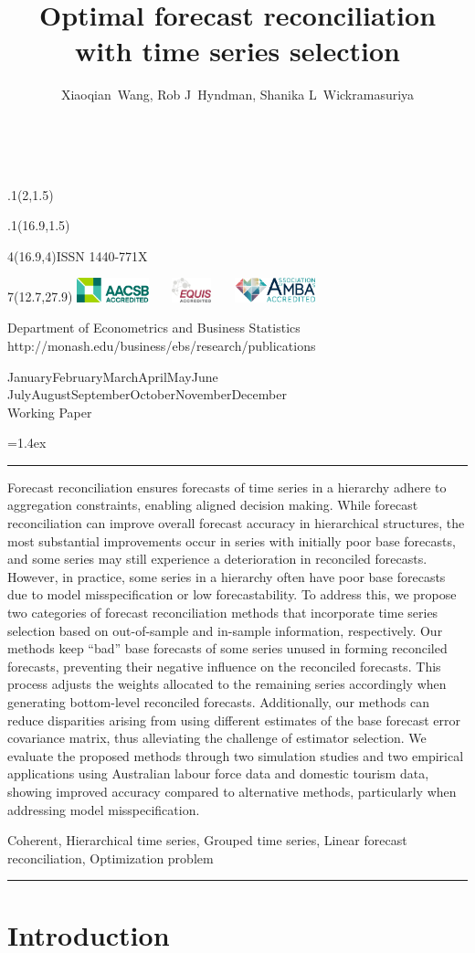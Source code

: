 \documentclass[11pt,a4paper,]{article}
\title{Optimal forecast reconciliation with time series selection}
\author{Xiaoqian~Wang, Rob J~Hyndman, Shanika L~Wickramasuriya}
\date{\sf\Date~\Month~\Year}
\makeatletter
\def\Date{\number\day}
\def\Month{\ifcase\month\or
 January\or February\or March\or April\or May\or June\or
 July\or August\or September\or October\or November\or December\fi}
\def\Year{\number\year}
\def\showjel{{\large\textsf{\textbf{JEL classification:}}~\@jel}}
\def\cover{{\sffamily\setcounter{page}{0}
        \thispagestyle{empty}
        \placefig{2}{1.5}{width=5cm}{_extensions/wp/monash2}
        \placefig{16.9}{1.5}{width=2.1cm}{_extensions/wp/MBSportrait}
        \begin{textblock}{4}(16.9,4)ISSN 1440-771X\end{textblock}
        \begin{textblock}{7}(12.7,27.9)\hfill
        \includegraphics[height=0.7cm]{_extensions/wp/AACSB}~~~
        \includegraphics[height=0.7cm]{_extensions/wp/EQUIS}~~~
        \includegraphics[height=0.7cm]{_extensions/wp/AMBA}
        \end{textblock}
        \vspace*{2cm}
        \begin{center}\Large
        Department of Econometrics and Business Statistics\\[.5cm]
        \footnotesize http://monash.edu/business/ebs/research/publications
        \end{center}\vspace{2cm}
        \begin{center}
        \fbox{\parbox{14cm}{\begin{onehalfspace}\centering\Huge\vspace*{0.3cm}
                \textsf{\textbf{\expandafter{\@title}}}\vspace{1cm}\par
                \LARGE\@author\end{onehalfspace}
        }}
        \end{center}
        \vfill
                \begin{center}\Large
                \Month~\Year\\[1cm]
                Working Paper \@wp
        \end{center}\vspace*{2cm}}}
\def\pageone{{\sffamily\setstretch{1}%
        \thispagestyle{empty}%
        \vbox to \textheight{%
        \raggedright\baselineskip=1.2cm
     {\fontsize{24.88}{30}\sffamily\textbf{\expandafter{\@title}}}
        \vspace{2cm}\par
        \hspace{1cm}\parbox{14cm}{\sffamily\large\@addresses}\vspace{1cm}\vfill
        \hspace{1cm}{\large\Date~\Month~\Year}\\[1cm]
        \hspace{1cm}\showjel\vss}}}
\def\blindtitle{{\sffamily
     \thispagestyle{plain}\raggedright\baselineskip=1.2cm
     {\fontsize{24.88}{30}\sffamily\textbf{\expandafter{\@title}}}\vspace{1cm}\par
        }}
\def\titlepage{{\cover\newpage\pageone\newpage\blindtitle}}
\let\maketitle\titlepage
\newenvironment{keywords}{\par\vspace{0.5cm}\noindent{\sffamily\textbf{Keywords:}}}{\vspace{0.25cm}\par\hrule\vspace{0.5cm}\par}
\renewenvironment{abstract}{\begin{minipage}{\textwidth}\parskip=1.4ex\noindent
\hrule\vspace{0.1cm}\par{\sffamily\textbf{\abstractname}}\newline}
  {\end{minipage}}
\def\placefig#1#2#3#4{\begin{textblock}{.1}(#1,#2)\rlap{\texttt{[image: \#4]}}\end{textblock}}
\makeatother
\begin{document}
\maketitle
\begin{abstract}
Forecast reconciliation ensures forecasts of time series in a hierarchy
adhere to aggregation constraints, enabling aligned decision making.
While forecast reconciliation can improve overall forecast accuracy in
hierarchical structures, the most substantial improvements occur in
series with initially poor base forecasts, and some series may still
experience a deterioration in reconciled forecasts. However, in
practice, some series in a hierarchy often have poor base forecasts due
to model misspecification or low forecastability. To address this, we
propose two categories of forecast reconciliation methods that
incorporate time series selection based on out-of-sample and in-sample
information, respectively. Our methods keep ``bad'' base forecasts of
some series unused in forming reconciled forecasts, preventing their
negative influence on the reconciled forecasts. This process adjusts the
weights allocated to the remaining series accordingly when generating
bottom-level reconciled forecasts. Additionally, our methods can reduce
disparities arising from using different estimates of the base forecast
error covariance matrix, thus alleviating the challenge of estimator
selection. We evaluate the proposed methods through two simulation
studies and two empirical applications using Australian labour force
data and domestic tourism data, showing improved accuracy compared to
alternative methods, particularly when addressing model
misspecification.
\end{abstract}
\begin{keywords}
Coherent, Hierarchical time series, Grouped time series, Linear forecast
reconciliation, Optimization problem
\end{keywords}

\ifdefined\Shaded\renewenvironment{Shaded}{\begin{tcolorbox}[borderline west={3pt}{0pt}{shadecolor}, boxrule=0pt, breakable, enhanced, interior hidden, sharp corners, frame hidden]}{\end{tcolorbox}}\fi

\hypertarget{sec-introduction}{%
\section{Introduction}\label{sec-introduction}}
\end{document}
